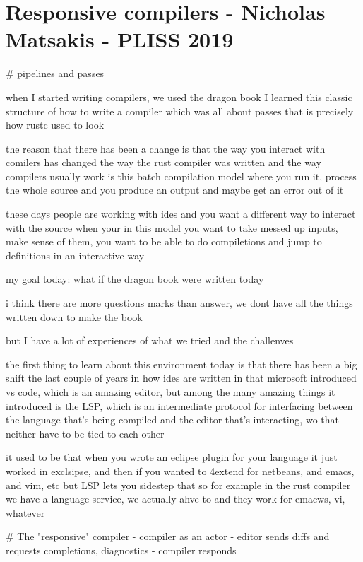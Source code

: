 \documentclass[12pt, a4paper]{report}
\begin{document}
\section*{Responsive compilers - Nicholas Matsakis - PLISS 2019}
\cite{niko2019responsive}

# pipelines and passes

when I started writing compilers, we used the dragon book
I learned this classic structure of how to write a compiler which was all about passes
that is precisely how rustc used to look

the reason that there has been a change is that the way you interact with comilers has changed
the way the rust compiler was written and the way compilers usually work is this batch compilation model
where you run it, process the whole source
and you produce an output and maybe get an error out of it

these days people are working with ides and you want a different way to interact with the source when your in this model
you want to take messed up inputs, make sense of them, you want to be able to do compiletions and jump to definitions in an interactive way

my goal today:
what if the dragon book were written today

i think there are more questions marks than answer, we dont have all the things written down to make the book

but I have a lot of experiences of what we tried and the challenves

the first thing to learn about this environment today is that there has been a big shift the last couple of years in how ides are written in that microsoft introduced vs code, which is an amazing editor, but among the many amazing things it introduced is the LSP, which is an intermediate protocol for interfacing between the language that's being compiled and the editor that's interacting, wo that neither have to be tied to each other

it used to be that when you wrote an eclipse plugin for your language it just worked in exclsipse, and then if you wanted to 4extend for netbeans, and emacs, and vim, etc
but LSP lets you sidestep that
so for example in the rust compiler we have a language service, we actually ahve to
and they work for emacws, vi, whatever

# The "responsive" compiler
- compiler as an actor
- editor sends diffs and requests completions, diagnostics
- compiler responds
\end{document}
